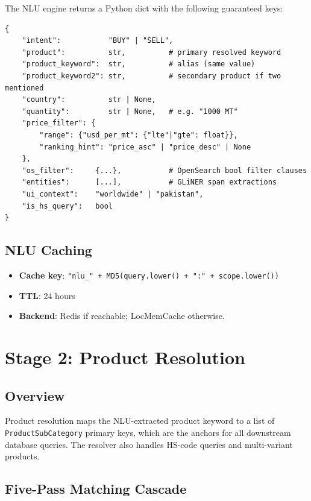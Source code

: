\documentclass[12pt,a4paper]{article}
\begin{document}
The NLU engine returns a Python dict with the following guaranteed keys:

\begin{lstlisting}[caption={NLU output schema (Python)}]
{
    "intent":           "BUY" | "SELL",
    "product":          str,          # primary resolved keyword
    "product_keyword":  str,          # alias (same value)
    "product_keyword2": str,          # secondary product if two mentioned
    "country":          str | None,
    "quantity":         str | None,   # e.g. "1000 MT"
    "price_filter": {
        "range": {"usd_per_mt": {"lte"|"gte": float}},
        "ranking_hint": "price_asc" | "price_desc" | None
    },
    "os_filter":     {...},           # OpenSearch bool filter clauses
    "entities":      [...],           # GLiNER span extractions
    "ui_context":    "worldwide" | "pakistan",
    "is_hs_query":   bool
}
\end{lstlisting}

\subsection{NLU Caching}

\begin{itemize}
  \item \textbf{Cache key}: \texttt{"nlu\_" + MD5(query.lower() + ":" + scope.lower())}
  \item \textbf{TTL}: 24 hours
  \item \textbf{Backend}: Redis if reachable; LocMemCache otherwise.
\end{itemize}

\newpage
\section{Stage 2: Product Resolution}
\label{sec:resolution}

\subsection{Overview}

Product resolution maps the NLU-extracted product keyword to a list of
\texttt{ProductSubCategory} primary keys, which are the anchors for all downstream
database queries.  The resolver also handles HS-code queries and multi-variant products.

\subsection{Five-Pass Matching Cascade}
\end{document}

